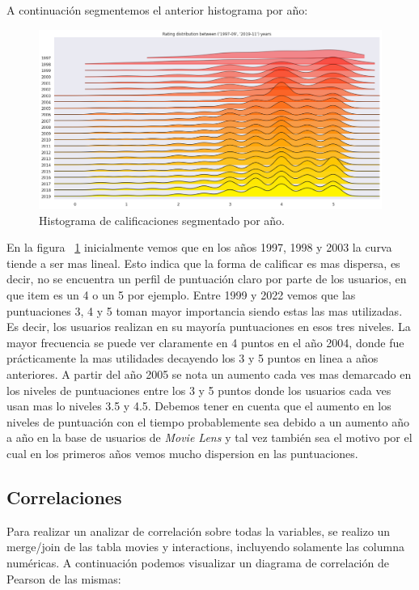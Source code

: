 \documentclass[11pt,a4paper,twoside]{thesis}
\begin{document}
\clearpage
A continuación segmentemos el anterior histograma por año:

\begin{figure}[h!]
	\centering
	\includegraphics[width=15cm]{./images/rating-by-year.png}
	\caption{Histograma de calificaciones segmentado por año.}
	\label{fig:ratingsYearHistPlot}
\end{figure}


En la figura ~\ref{fig:ratingsYearHistPlot} inicialmente vemos que en los años 1997, 1998 y 2003 la curva tiende a ser mas lineal. Esto indica que la forma de calificar es mas dispersa, es decir, no se encuentra un perfil de puntuación claro por parte de los usuarios, en que item es un 4 o un 5 por ejemplo. Entre 1999 y 2022 vemos que las puntuaciones 3, 4 y 5 toman mayor importancia siendo estas las mas utilizadas. Es decir, los usuarios realizan en su mayoría puntuaciones en esos tres niveles. La mayor frecuencia se puede ver claramente en 4 puntos en el año 2004, donde fue prácticamente la mas utilidades decayendo los 3 y 5 puntos en linea a años anteriores. A partir del año 2005 se nota un aumento cada ves mas demarcado en los niveles de puntuaciones entre los 3 y 5 puntos donde los usuarios cada ves usan mas lo niveles 3.5 y 4.5. Debemos tener en cuenta que el aumento en los niveles de puntuación con el tiempo probablemente sea debido a un aumento año a año en la base de usuarios de \textit{Movie Lens} y tal vez también sea el motivo por el cual en los primeros años vemos mucho dispersion en las puntuaciones.

\clearpage

\subsection{Correlaciones}

Para realizar un analizar de correlación sobre todas la variables, se realizo un merge/join de las tabla movies y interactions, incluyendo solamente las columna numéricas. A continuación podemos visualizar un diagrama de correlación de Pearson de las mismas:
\end{document}
